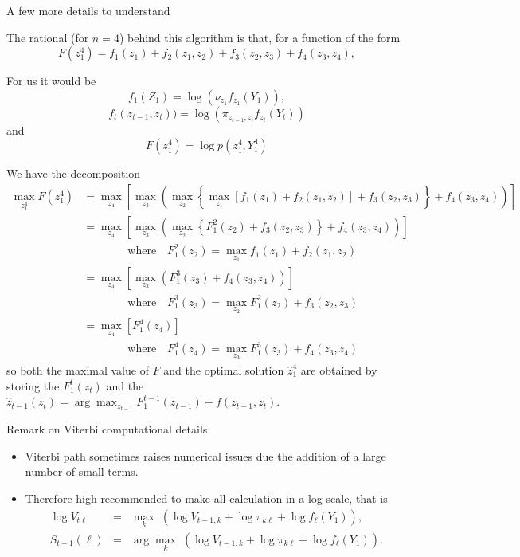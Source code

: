 \documentclass[compress,10pt]{beamer}
\begin{document}
 

\begin{frame}[allowframebreaks]{A few more details to understand}
 
The rational (for $n =4$) behind this algorithm is that, for a function of the form
$$
F(z_1^4) = f_1(z_1) + f_2(z_1, z_2) + f_3(z_2, z_3) + f_4(z_3, z_4),
$$


For us it would be 
$$f_1(Z_1) = \log \left(\nu_{z_1} f_{z_1}(Y_1)\right),$$ $$f_t(z_{t-1}, z_t)) = \log \left(\pi_{z_{t-1},z_t} f_{z_t}(Y_t)\right)$$ and $$F(z_1^4) =  \log p(z_1^4, Y_1^4)$$ 

We have the decomposition
{\small 
\begin{align*}
 \max_{z_1^4} F(z_ 1^4) 
 & = \max_{z_4} \left[ \max_{z_3} \left( \max_{z_2} \left\{ \max_{z_1} \left[f_1(z_1) + f_2(z_1, z_2) \right] + f_3(z_2, z_3) \right\} + f_4(z_3, z_4) \right) \right] \\
 & = \max_{z_4} \left[ \max_{z_3} \left( \max_{z_2} \left\{ F_1^2(z_2) + f_3(z_2, z_3) \right\} + f_4(z_3, z_4) \right) \right]   \\
 & \qquad \qquad \text{where} \quad F_1^2(z_2) = \max_{z_1} f_1(z_1) + f_2(z_1, z_2) \\
 & = \max_{z_4} \left[ \max_{z_3} \left( F_1^3(z_3) + f_4(z_3, z_4) \right) \right]   \\
 & \qquad \qquad \text{where} \quad F_1^3(z_3) = \max_{z_2} F_1^2(z_2) + f_3(z_2, z_3) \\
 & = \max_{z_4} \left[ F_1^4(z_4) \right]   \\
 & \qquad \qquad \text{where} \quad F_1^4(z_4) = \max_{z_3} F_1^3(z_3) + f_4(z_3, z_4)
\end{align*}}
so both the maximal value of $F$ and the optimal solution $\widehat{z}_1^4$ are obtained by storing the $F_1^t(z_t)$ and the $\widehat{z}_{t-1}(z_t) = \arg\max_{z_{t-1}} F_1^{t-1}(z_{t-1}) + f(z_{t-1}, z_t)$.


\end{frame}

\begin{frame}{Remark on Viterbi computational details}
 
\begin{itemize}
 \item Viterbi path sometimes raises numerical issues due the addition of a large number of small terms. 
 \item Therefore high recommended to make all calculation in a log scale, that is
 \begin{eqnarray*}
  \log V_{t\ell} & = & \max_k \; \left(\log V_{t-1, k} + \log \pi_{k\ell} + \log f_\ell(Y_1)\right), \\
  S_{t-1}(\ell) & = & \arg\max_k \; \left(\log V_{t-1, k} + \log \pi_{k\ell} + \log f_\ell(Y_1)\right).
\end{eqnarray*}

\end{itemize}
\end{frame}
\end{document}
